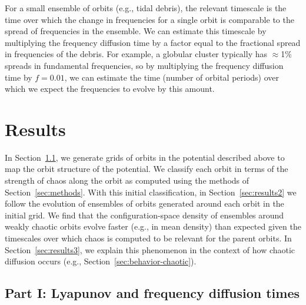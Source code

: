 \documentclass[letterpaper,12pt,preprint]{aastex}
\begin{document}
For a small ensemble of orbits (e.g., tidal debris), the relevant timescale is the time over which the change in frequencies for a single orbit is comparable to the spread of frequencies in the ensemble. We can estimate this timescale by multiplying the frequency diffusion time by a factor equal to the fractional spread in frequencies of the debris. For example, a globular cluster typically has $\approx$1\% spreads in fundamental frequencies, so by multiplying the frequency diffusion time by $f = 0.01$, we can estimate the time (number of orbital periods) over which we expect the frequencies to evolve by this amount.

%
\section{Results}

In Section~\ref{sec:results1}, we generate grids of orbits in the potential described above to map the orbit structure of the potential. We classify each orbit in terms of the strength of chaos along the orbit as computed using the methods of Section~\ref{sec:methods}. With this initial classification, in Section~\ref{sec:results2} we follow the evolution of ensembles of orbits generated around each orbit in the initial grid. We find that the configuration-space density of ensembles around weakly chaotic orbits evolve faster (e.g., in mean density) than expected given the timescales over which chaos is computed to be relevant for the parent orbits. In Section~\ref{sec:results3}, we explain this phenomenon in the context of how chaotic diffusion occurs (e.g., Section~\ref{sec:behavior-chaotic}).

\subsection{Part I: Lyapunov and frequency diffusion times}\label{sec:results1}
\end{document}

